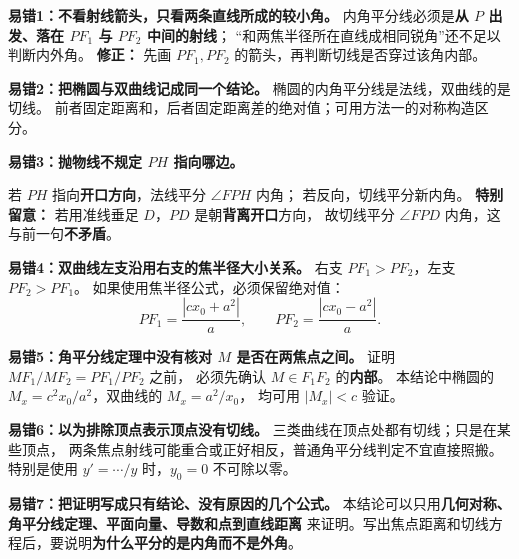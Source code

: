 \begin{trapbox}
\textbf{易错1：不看射线箭头，只看两条直线所成的较小角。}
内角平分线必须是\textbf{从 $P$ 出发、落在 $PF_1$ 与 $PF_2$ 中间的射线}；
“和两焦半径所在直线成相同锐角”还不足以判断内外角。
\textbf{修正：} 先画 $PF_1,PF_2$ 的箭头，再判断切线是否穿过该角内部。

\medskip\noindent
\textbf{易错2：把椭圆与双曲线记成同一个结论。}
椭圆的内角平分线是法线，双曲线的是切线。
前者固定距离和，后者固定距离差的绝对值；可用方法一的对称构造区分。

\medskip\noindent
\textbf{易错3：抛物线不规定 $PH$ 指向哪边。}
\begin{center}\end{center}
若 $PH$ 指向\textbf{开口方向}，法线平分 $\angle FPH$ 内角；
若反向，切线平分新内角。
\textbf{特别留意：} 若用准线垂足 $D$，$PD$ 是朝\textbf{背离开口}方向，
故切线平分 $\angle FPD$ 内角，这与前一句\textbf{不矛盾}。

\medskip\noindent
\textbf{易错4：双曲线左支沿用右支的焦半径大小关系。}
右支 $PF_1>PF_2$，左支 $PF_2>PF_1$。
如果使用焦半径公式，必须保留绝对值：
\[
PF_1=\frac{|cx_0+a^2|}{a},\qquad
PF_2=\frac{|cx_0-a^2|}{a}.
\]

\medskip\noindent
\textbf{易错5：角平分线定理中没有核对 $M$ 是否在两焦点之间。}
证明 $MF_1/MF_2=PF_1/PF_2$ 之前，
必须先确认 $M\in F_1F_2$ 的\textbf{内部}。
本结论中椭圆的 $M_x=c^2x_0/a^2$，双曲线的 $M_x=a^2/x_0$，
均可用 $|M_x|<c$ 验证。

\medskip\noindent
\textbf{易错6：以为排除顶点表示顶点没有切线。}
三类曲线在顶点处都有切线；只是在某些顶点，
两条焦点射线可能重合或正好相反，普通角平分线判定不宜直接照搬。
特别是使用 $y'=\cdots/y$ 时，$y_0=0$ 不可除以零。

\medskip\noindent
\textbf{易错7：把证明写成只有结论、没有原因的几个公式。}
本结论可以只用\textbf{几何对称、角平分线定理、平面向量、导数和点到直线距离}
来证明。写出焦点距离和切线方程后，要说明\textbf{为什么平分的是内角而不是外角}。
\end{trapbox}

